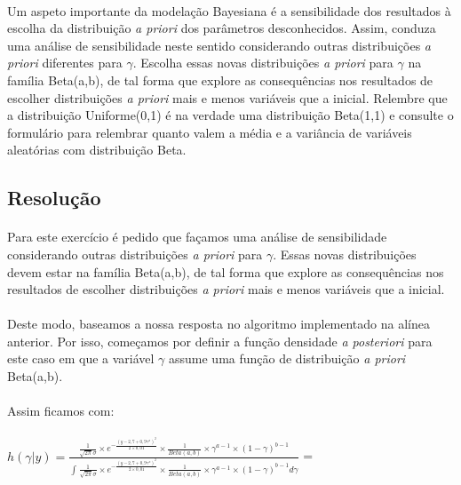 \documentclass{article}
\begin{document}
			\paragraph{}
				Um aspeto importante da modelação Bayesiana é a sensibilidade dos resultados à escolha da distribuição \textit{a priori} dos parâmetros desconhecidos. Assim, conduza uma análise de sensibilidade neste sentido considerando outras distribuições \textit{a priori} diferentes para $\gamma$. Escolha essas novas distribuições \textit{a priori} para $\gamma$ na família Beta(a,b), de tal forma que explore as consequências nos resultados de escolher distribuições \textit{a priori} mais e menos variáveis que a inicial.  Relembre que a distribuição Uniforme(0,1) é na verdade uma distribuição Beta(1,1) e consulte o formulário para relembrar quanto valem a média e a variância de variáveis aleatórias com distribuição Beta.

			\subsection*{Resolução}
				\paragraph{}
				Para este exercício é pedido que façamos uma análise de sensibilidade considerando outras distribuições \textit{a priori} para $\gamma$. Essas novas distribuições devem estar na família Beta(a,b), de tal forma que explore as consequências nos resultados de escolher distribuições \textit{a priori} mais e menos variáveis que a inicial.
				\paragraph{}
				Deste modo, baseamos a nossa resposta no algoritmo implementado na alínea anterior. Por isso, começamos por definir a função densidade \textit{a posteriori} para este caso em que a variável $\gamma$ assume uma função de distribuição \textit{a priori} Beta(a,b).
				\paragraph{}
				Assim ficamos com:

				\paragraph{}
				
				\centerline{$h(\gamma|y) = \frac{   \frac{1}{\sqrt{2\pi}\sigma}   \times   e^{-\frac{{(y-2,7+0,9\gamma^{x})}^2}{2\times0,01}}   \times    \frac{1}{Beta(a,b)}   \times   \gamma^{a-1}   \times   (1-\gamma)^{b-1}   }{   \int_{}^{} \frac{1}{\sqrt{2\pi}\sigma}   \times   e^{-\frac{{(y-2,7+0,9\gamma^{x})}^2}{2\times0,01}}   \times    \frac{1}{Beta(a,b)}   \times   \gamma^{a-1}   \times   (1-\gamma)^{b-1} d\gamma   }$ =}
\end{document}
